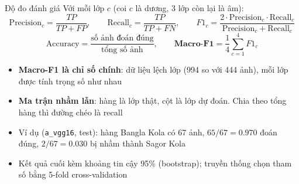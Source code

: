 \documentclass[aspectratio=169,10pt]{beamer}
\begin{document}
\begin{frame}{Độ đo đánh giá}
Với mỗi lớp $c$ (coi $c$ là dương, 3 lớp còn lại là âm):
\[ \text{Precision}_c=\frac{TP}{TP+FP},\qquad \text{Recall}_c=\frac{TP}{TP+FN},\qquad F1_c=\frac{2\cdot \text{Precision}_c\cdot \text{Recall}_c}{\text{Precision}_c+\text{Recall}_c} \]
\[ \text{Accuracy}=\frac{\text{số ảnh đoán đúng}}{\text{tổng số ảnh}},\qquad \textbf{Macro-F1}=\frac{1}{4}\sum_{c=1}^{4}F1_c \]
\begin{itemize}
\item \textbf{Macro-F1 là chỉ số chính}: dữ liệu lệch lớp (994 so với 444 ảnh), mỗi lớp được tính trọng số như nhau
\item \textbf{Ma trận nhầm lẫn}: hàng là lớp thật, cột là lớp dự đoán. Chia theo tổng hàng thì đường chéo là recall
\item Ví dụ (\texttt{a\_vgg16}, test): hàng Bangla Kola có 67 ảnh, $65/67=0.970$ đoán đúng, $2/67=0.030$ bị nhầm thành Sagor Kola
\item Kết quả cuối kèm khoảng tin cậy 95\% (bootstrap); truyền thống chọn tham số bằng 5-fold cross-validation
\end{itemize}
\end{frame}
\end{document}
